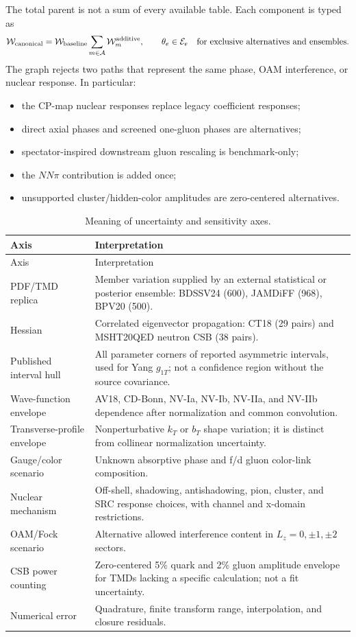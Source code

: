 \documentclass[11pt]{article}
\begin{document}
The total parent is not a sum of every available table.  Each component is
typed as
\begin{equation}
\mathcal W_{\rm canonical}
=\mathcal W_{\rm baseline}
\sum_{m\in\mathcal A}\mathcal W_m^{\rm additive},
\qquad
\theta_e\in\mathcal E_e
\quad\text{for exclusive alternatives and ensembles}.
\label{eq:composition}
\end{equation}
The graph rejects two paths that represent the same phase, OAM
interference, or nuclear response.  In particular:
\begin{itemize}
  \item the CP-map nuclear responses replace legacy coefficient responses;
  \item direct axial phases and screened one-gluon phases are alternatives;
  \item spectator-inspired downstream gluon rescaling is benchmark-only;
  \item the \(NN\pi\) contribution is added once;
  \item unsupported cluster/hidden-color amplitudes are zero-centered
  alternatives.
\end{itemize}

\begin{longtable}{L{0.22\textwidth}L{0.69\textwidth}}
\caption{Meaning of uncertainty and sensitivity axes.}
\label{tab:uncertainty}\\
\toprule
Axis & Interpretation \\
\midrule
\endfirsthead
\toprule
Axis & Interpretation \\
\midrule
\endhead
PDF/TMD replica &
Member variation supplied by an external statistical or posterior ensemble:
BDSSV24 (600), JAMDiFF (968), BPV20 (500).\\
Hessian &
Correlated eigenvector propagation: CT18 (29 pairs) and MSHT20QED neutron
CSB (38 pairs).\\
Published interval hull &
All parameter corners of reported asymmetric intervals, used for Yang
\(g_{1T}\); not a confidence region without the source covariance.\\
Wave-function envelope &
AV18, CD-Bonn, NV-Ia, NV-Ib, NV-IIa, and NV-IIb dependence after
normalization and common convolution.\\
Transverse-profile envelope &
Nonperturbative \(k_T\) or \(b_T\) shape variation; it is distinct from
collinear normalization uncertainty.\\
Gauge/color scenario &
Unknown absorptive phase and f/d gluon color-link composition.\\
Nuclear mechanism &
Off-shell, shadowing, antishadowing, pion, cluster, and SRC response choices,
with channel and x-domain restrictions.\\
OAM/Fock scenario &
Alternative allowed interference content in \(L_z=0,\pm1,\pm2\) sectors.\\
CSB power counting &
Zero-centered 5\% quark and 2\% gluon amplitude envelope for TMDs lacking a
specific calculation; not a fit uncertainty.\\
Numerical error &
Quadrature, finite transform range, interpolation, and closure residuals.\\
\bottomrule
\end{longtable}
\end{document}
